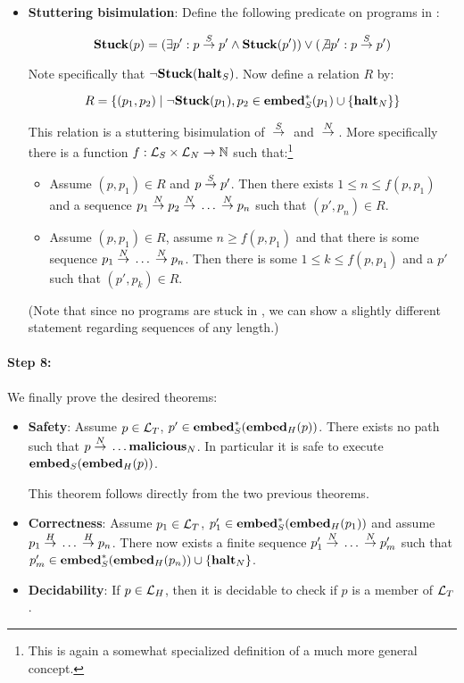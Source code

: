\begin{itemize}
\item \textbf{Stuttering bisimulation}: Define the following predicate on
  programs in \simplelang:

  $$\mathbf{Stuck}(p) = (\exists p': p {{}\stackrel{S}{->}{}} p' \land \mathbf{Stuck}(p')) \lor (\not\exists p': p {{}\stackrel{S}{->}{}} p')$$

  Note specifically that $\neg\mathbf{Stuck}({\mathbf{halt}_S})$. Now define a relation $R$
  by:

  $$R = \{(p_1, p_2) \mid \neg\mathbf{Stuck}(p_1), p_2 \in {\ensuremath{\mathbf{embed}^\ast_S}}(p_1) \cup \{{\mathbf{halt}_N}\}\}$$

  This relation is a stuttering bisimulation of ${{}\stackrel{S}{->}{}}$ and
  ${{}\stackrel{N}{->}{}}$. More specifically there is a function
  $f : \mathcal{L}_S \times \mathcal{L}_N \to \mathbb{N}$ such that:\footnote{This is
    again a somewhat specialized definition of a much more general concept.}

  \begin{itemize}
  \item Assume $(p, p_1) \in R$ and $p {{}\stackrel{S}{->}{}} p'$. Then there exists
    $1 \leq n \leq f(p, p_1)$ and a sequence
    $p_1 {{}\stackrel{N}{->}{}} p_2 {{}\stackrel{N}{->}{}} \dots {{}\ensuremath{\stackrel{N}{->}}{}} p_n$ such that
    $(p', p_n) \in R$.
  \item Assume $(p, p_1) \in R$, assume $n \geq f(p, p_1)$ and that there is
    some sequence $p_1 {{}\stackrel{N}{->}{}} \dots {{}\ensuremath{\stackrel{N}{->}}{}} p_n$. Then there is some
    $1 \leq k \leq f(p, p_1)$ and a $p'$ such that $(p', p_k) \in R$.
  \end{itemize}

  (Note that since no programs are stuck in \nativelang, we can show a slightly
  different statement regarding sequences of any length.)
\end{itemize}

\paragraph{Step 8:} We finally prove the desired theorems:
\begin{itemize}
\item \textbf{Safety}: Assume $p \in \mathcal{L}_T$,
  $p' \in {\ensuremath{\mathbf{embed}^\ast_S}}({{\mathbf{embed}}_H}(p))$. There exists no path such that
  $p {{}\stackrel{N}{->}{}} \dots {\ensuremath{{\mathbf{malicious}}_N}}$. In particular it is safe to
  execute ${{\mathbf{embed}}_S}({{\mathbf{embed}}_H}(p))$.

  This theorem follows directly from the two previous theorems.

\item \textbf{Correctness}: Assume $p_1 \in \mathcal{L}_T$,
  $p_1' \in {\ensuremath{\mathbf{embed}^\ast_S}}({{\mathbf{embed}}_H}(p_1))$ and assume
  $p_1 {{}\stackrel{H}{->}{}} \dots {{}\ensuremath{\stackrel{H}{->}}{}} p_n$. There now exists a finite sequence
  $p_1' {{}\stackrel{N}{->}{}} \dots {{}\ensuremath{\stackrel{N}{->}}{}} p_m'$ such that
  $p_m' \in {\ensuremath{\mathbf{embed}^\ast_S}}({{\mathbf{embed}}_H}(p_n)) \cup \{{\mathbf{halt}_N}\}$.

\item \textbf{Decidability}: If $p \in \mathcal{L}_H$, then it is decidable to check
  if $p$ is a member of $\mathcal{L}_T$.
\end{itemize}
